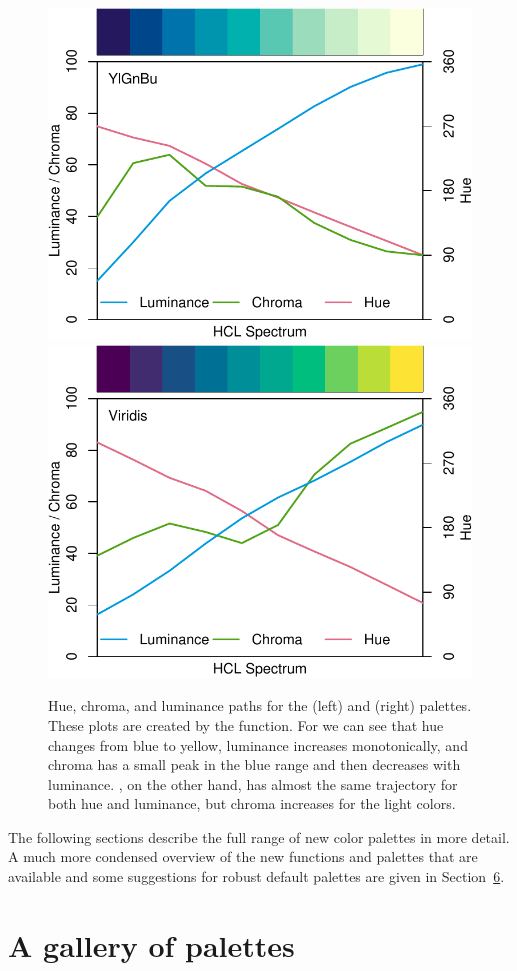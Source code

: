 \begin{figure}[t!]

{\centering \includegraphics[width=0.49\linewidth]{color_files/figure-latex/ylgnbu-viridis-1} \includegraphics[width=0.49\linewidth]{color_files/figure-latex/ylgnbu-viridis-2} 

}

\caption{Hue, chroma, and luminance paths for the  (left) and  (right) palettes. These plots are created by the  function. For  we can see that hue changes from blue to yellow, luminance increases monotonically, and chroma has a small peak in the blue range and then decreases with luminance. , on the other hand, has almost the same trajectory for both hue and luminance, but chroma increases for the light colors.}\label{fig:ylgnbu-viridis}
\end{figure}

The following sections describe the full range of
new color palettes in more detail. A much more condensed
overview of the new functions and palettes that are available and
some suggestions for robust default palettes are given in
Section~\protect\hyperlink{sec:summary}{6}.

\hypertarget{a-gallery-of-palettes}{%
\section{A gallery of palettes}\label{a-gallery-of-palettes}}

